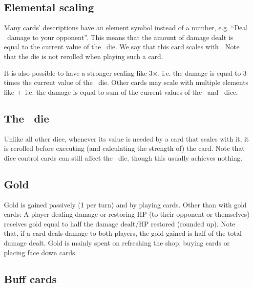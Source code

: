 \documentclass[dvipsnames,parskip,a4paper]{scrartcl}
\newcommand{\iconsize}{3.4mm}
\newcommand{\icondepth}{0.45mm}
\newcommand{\icon}[1]{\raisebox{-\icondepth}{\texttt{[image:  \#1 ]}}}
\newcommand{\chance}{\icon{icons/chance.png}}
\newcommand{\fire}{\icon{icons/fire.png}}
\newcommand{\earth}{\icon{icons/earth.png}}
\begin{document}
\subsection*{Elemental scaling}

Many cards' descriptions have an element symbol instead of a number, e.g. ``Deal \fire \ damage to your opponent''. This means that the amount of damage dealt is equal to the current value of the \fire \ die. We say that this card scales with \fire. Note that the die is not rerolled when playing such a card.

\vspace{4pt}

It is also possible to have a stronger scaling like 3\hspace{1pt}$\times$\hspace{1pt}\fire, i.e. the damage is equal to 3 times the current value of the \fire \ die. Other cards may scale with multiple elements like \earth\hspace{1pt}$+$\hspace{1pt}\chance \, i.e. the damage is equal to sum of the current values of the \earth \ and \chance \ dice.

\subsection*{The \chance \ die}

Unlike all other dice, whenever its value is needed by a card that scales with it, it is rerolled before executing (and calculating the strength of) the card. Note that dice control cards can still affect the \chance \ die, though this usually achieves nothing.

\subsection*{Gold}

Gold is gained passively (1 per turn) and by playing cards. Other than with gold cards: A player dealing damage or restoring HP (to their opponent or themselves) receives gold equal to half the damage dealt/HP restored (rounded up). Note that, if a card deals damage to both players, the gold gained is half of the total damage dealt. Gold is mainly spent on refreshing the shop, buying cards or placing face down cards.

\subsection*{Buff cards}
\end{document}

